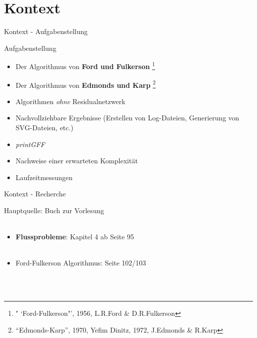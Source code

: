 \documentclass{beamer}
\begin{document}
    \section{Kontext}
    \begin{frame}{Kontext - Aufgabenstellung}
        \begin{block}{Aufgabenstellung}
            \begin{itemize}
                \item Der Algorithmus von \textbf{Ford und Fulkerson} \footnote{" `Ford-Fulkerson"', 1956, L.R.Ford \& D.R.Fulkerson}
                \item Der Algorithmus von \textbf{Edmonds und Karp} \footnote{"`Edmonds-Karp"', 1970, Yefim Dinitz, 1972, J.Edmonds \& R.Karp}
                \item Algorithmen \textit{ohne} Residualnetzwerk
                \item Nachvollziehbare Ergebnisse (Erstellen von Log-Dateien, Generierung von SVG-Dateien, etc.)
                \item \textit{printGFF}
                \item Nachweise einer erwarteten Komplexit\"at
                \item Laufzeitmessungen
            \end{itemize}
        \end{block}
    \end{frame}

    \begin{frame}{Kontext - Recherche}
        \begin{block}{Hauptquelle: Buch zur Vorlesung}
            \\~\\
            \begin{itemize}
                \item \textbf{Flussprobleme}: Kapitel 4 ab Seite 95\\~\\
                \item Ford-Fulkerson Algorithmus: Seite 102/103
            \end{itemize}
            \\~\\
        \end{block}
    \end{frame}
\end{document}
